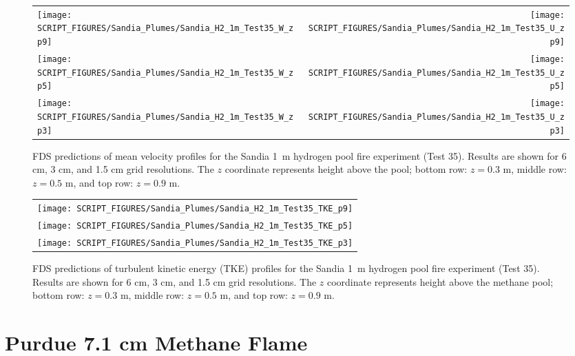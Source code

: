 \begin{figure}[p]
\begin{tabular*}{\textwidth}{l@{\extracolsep{\fill}}r}
\texttt{[image: SCRIPT\_FIGURES/Sandia\_Plumes/Sandia\_H2\_1m\_Test35\_W\_zp9]} &
\texttt{[image: SCRIPT\_FIGURES/Sandia\_Plumes/Sandia\_H2\_1m\_Test35\_U\_zp9]} \\
\texttt{[image: SCRIPT\_FIGURES/Sandia\_Plumes/Sandia\_H2\_1m\_Test35\_W\_zp5]} &
\texttt{[image: SCRIPT\_FIGURES/Sandia\_Plumes/Sandia\_H2\_1m\_Test35\_U\_zp5]} \\
\texttt{[image: SCRIPT\_FIGURES/Sandia\_Plumes/Sandia\_H2\_1m\_Test35\_W\_zp3]} &
\texttt{[image: SCRIPT\_FIGURES/Sandia\_Plumes/Sandia\_H2\_1m\_Test35\_U\_zp3]}
\end{tabular*}
\caption[Sandia 1~m hydrogen pool fire (Test 35) mean velocity profiles]
{FDS predictions of mean velocity profiles for the Sandia 1~m hydrogen pool fire experiment (Test 35). Results are shown for 6 cm, 3 cm, and 1.5 cm grid resolutions. The $z$ coordinate represents height above the pool; bottom row: $z=0.3$ m, middle row: $z=0.5$ m, and top row: $z=0.9$ m.}
\label{Sandia_H2_1m_Test35_velocity}
\end{figure}

\begin{figure}[p]
\begin{center}
\begin{tabular}{c}
\texttt{[image: SCRIPT\_FIGURES/Sandia\_Plumes/Sandia\_H2\_1m\_Test35\_TKE\_p9]} \\
\texttt{[image: SCRIPT\_FIGURES/Sandia\_Plumes/Sandia\_H2\_1m\_Test35\_TKE\_p5]} \\
\texttt{[image: SCRIPT\_FIGURES/Sandia\_Plumes/Sandia\_H2\_1m\_Test35\_TKE\_p3]}
\end{tabular}
\caption[Sandia 1~m hydrogen pool fire (Test 25) turbulent kinetic energy]
{FDS predictions of turbulent kinetic energy (TKE) profiles for the Sandia 1~m hydrogen pool fire experiment (Test 35). Results are shown for 6 cm, 3 cm, and 1.5 cm grid resolutions. The $z$ coordinate represents height above the methane pool; bottom row: $z=0.3$ m, middle row: $z=0.5$ m, and top row: $z=0.9$ m.}
\label{Sandia_H2_1m_Test35_tke}
\end{center}
\end{figure}


\clearpage

\section{Purdue 7.1 cm Methane Flame}
\label{Purdue_Flames}

